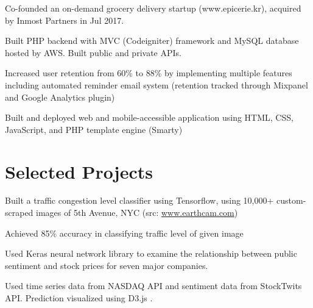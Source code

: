 \documentclass[]{deedy-resume-openfont}
\begin{document}
\begin{minipage}[t]{0.63\textwidth}
\vspace{\topsep} %
\begin{tightemize}
\item Co-founded an on-demand grocery delivery startup (www.epicerie.kr), acquired by Inmost Partners in Jul 2017.
\item Built PHP backend with MVC (Codeigniter) framework and MySQL database hosted by AWS. Built public and private APIs.
\item Increased user retention from 60\% to 88\% by implementing multiple features including automated reminder email system (retention tracked through Mixpanel and Google
Analytics plugin)
\item Built and deployed web and mobile-accessible application using HTML, CSS, JavaScript, and PHP template engine (Smarty)
\end{tightemize}
\sectionsep

\section{Selected Projects}



\begin{tightemize}
\item Built a traffic congestion level classifier using Tensorflow, using 10,000+ custom-scraped images of 5th Avenue, NYC (src: \href{https://www.earthcam.com/}{www.earthcam.com})
\item Achieved 85\% accuracy in classifying traffic level of given image
\end{tightemize}
\sectionsep

\begin{tightemize}
\item Used Keras neural network library to examine the relationship between public sentiment and stock prices for seven major companies.
\item Used time series data from NASDAQ API and sentiment data from StockTwits API. Prediction visualized using D3.js .  
\end{tightemize}
\sectionsep



\end{minipage}
\end{document}
